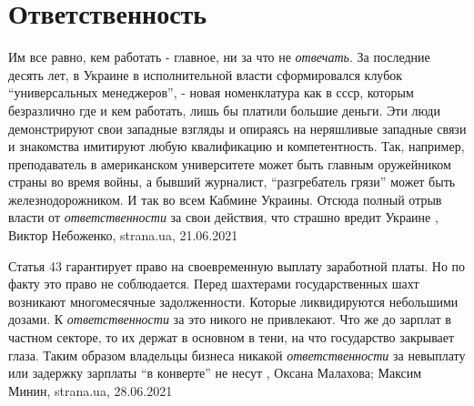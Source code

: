  
 
 
 
 
\chapter{Ответственность}

Им все равно, кем работать - главное, ни за что не \emph{отвечать}.  За
последние десять лет, в Украине в исполнительной власти сформировался клубок
\enquote{универсальных менеджеров}, - новая номенклатура как в ссср, которым безразлично
где и кем работать, лишь бы платили большие деньги. Эти люди демонстрируют свои
западные взгляды и опираясь на неряшливые западные связи и знакомства имитируют
любую квалификацию и компетентность. Так, например, преподаватель в
американском университете может быть главным оружейником страны во время войны,
а бывший журналист, \enquote{разгребатель грязи} может быть железнодорожником. И так во
всем Кабмине Украины.  Отсюда полный отрыв власти от \emph{ответственности} за
свои действия, что страшно вредит Украине
, 
Виктор Небоженко, strana.ua, 21.06.2021


Статья 43 гарантирует право на своевременную выплату заработной платы.  Но по
факту это право не соблюдается. Перед шахтерами государственных шахт возникают
многомесячные задолженности. Которые ликвидируются небольшими дозами. К
\emph{ответственности} за это никого не привлекают.  Что же до зарплат в частном
секторе, то их держат в основном в тени, на что государство закрывает глаза.
Таким образом владельцы бизнеса никакой \emph{ответственности} за невыплату или
задержку зарплаты \enquote{в конверте} не несут
, 
Оксана Малахова; Максим Минин, strana.ua, 28.06.2021

